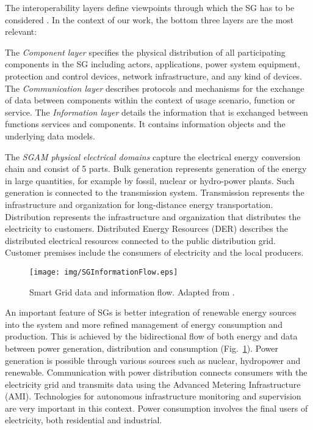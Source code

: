 \documentclass[journal]{IEEEtran}
\begin{document}
The interoperability layers define  viewpoints through which the SG has to be considered \cite{ref:cen2012group}. In the context of our work, the bottom three layers are the most relevant:

The \textit{Component layer} specifies the physical distribution of all participating components in the SG including actors, applications, power system equipment, protection and control devices, network infrastructure, and any kind of devices. The \textit{Communication layer} describes protocols and mechanisms for the exchange of data between components within the context of usage scenario, function or service. The \textit{Information layer} details the information that is exchanged between functions services and components. It contains information objects and the underlying data models.

The \textit{SGAM physical electrical domains} capture the electrical energy conversion chain and consist of 5 parts. Bulk generation represents generation of the energy in large quantities, for example by fossil, nuclear or hydro-power plants. Such generation is connected to the transmission system. Transmission represents the infrastructure and organization for long-distance energy transportation. Distribution represents the infrastructure and organization that distributes the electricity to customers. Distributed Energy Resources (DER) describes the distributed electrical resources connected to the public distribution grid. Customer premises include the consumers of electricity and the local producers.


\begin{figure}[!htbp]
\centering
\texttt{[image: img/SGInformationFlow.eps]}
\caption{Smart Grid data and information flow. Adapted from \cite{ref:daki2017big}.}
\label{fig:sg-diagram}
\end{figure}


An important feature of SGs is better integration of renewable energy sources into the system and more refined management of energy consumption and production. This is achieved by the bidirectional flow of both energy and data between power generation, distribution and consumption (Fig.~\ref{fig:sg-diagram}). Power generation is possible through various sources such as nuclear, hydropower and renewable. Communication with power distribution connects consumers with the electricity grid and transmits data using the Advanced Metering Infrastructure (AMI). Technologies for autonomous infrastructure monitoring and supervision are very important in this context. Power consumption involves the final users of electricity, both residential and industrial. 
\end{document}
